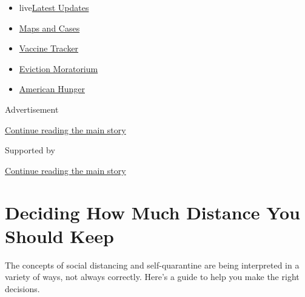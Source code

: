 \begin{itemize}
\tightlist
\item
  live\href{https://www.nytimes3xbfgragh.onion/2020/09/05/world/coronavirus-covid.html?name=styln-coronavirus-national\&region=TOP_BANNER\&block=storyline_menu_recirc\&action=click\&pgtype=Article\&impression_id=4b7309c0-efb9-11ea-b221-c1ac8458c493\&variant=undefined}{Latest
  Updates}
\item
  \href{https://www.nytimes3xbfgragh.onion/interactive/2020/us/coronavirus-us-cases.html?name=styln-coronavirus-national\&region=TOP_BANNER\&block=storyline_menu_recirc\&action=click\&pgtype=Article\&impression_id=4b7309c1-efb9-11ea-b221-c1ac8458c493\&variant=undefined}{Maps
  and Cases}
\item
  \href{https://www.nytimes3xbfgragh.onion/interactive/2020/science/coronavirus-vaccine-tracker.html?name=styln-coronavirus-national\&region=TOP_BANNER\&block=storyline_menu_recirc\&action=click\&pgtype=Article\&impression_id=4b7309c2-efb9-11ea-b221-c1ac8458c493\&variant=undefined}{Vaccine
  Tracker}
\item
  \href{https://www.nytimes3xbfgragh.onion/2020/09/02/your-money/eviction-moratorium-covid.html?name=styln-coronavirus-national\&region=TOP_BANNER\&block=storyline_menu_recirc\&action=click\&pgtype=Article\&impression_id=4b7309c3-efb9-11ea-b221-c1ac8458c493\&variant=undefined}{Eviction
  Moratorium}
\item
  \href{https://www.nytimes3xbfgragh.onion/interactive/2020/09/02/magazine/food-insecurity-hunger-us.html?name=styln-coronavirus-national\&region=TOP_BANNER\&block=storyline_menu_recirc\&action=click\&pgtype=Article\&impression_id=4b7309c4-efb9-11ea-b221-c1ac8458c493\&variant=undefined}{American
  Hunger}
\end{itemize}

Advertisement

\protect\hyperlink{after-top}{Continue reading the main story}

Supported by

\protect\hyperlink{after-sponsor}{Continue reading the main story}

\hypertarget{deciding-how-much-distance-you-should-keep}{%
\section{Deciding How Much Distance You Should
Keep}\label{deciding-how-much-distance-you-should-keep}}

The concepts of social distancing and self-quarantine are being
interpreted in a variety of ways, not always correctly. Here's a guide
to help you make the right decisions.

